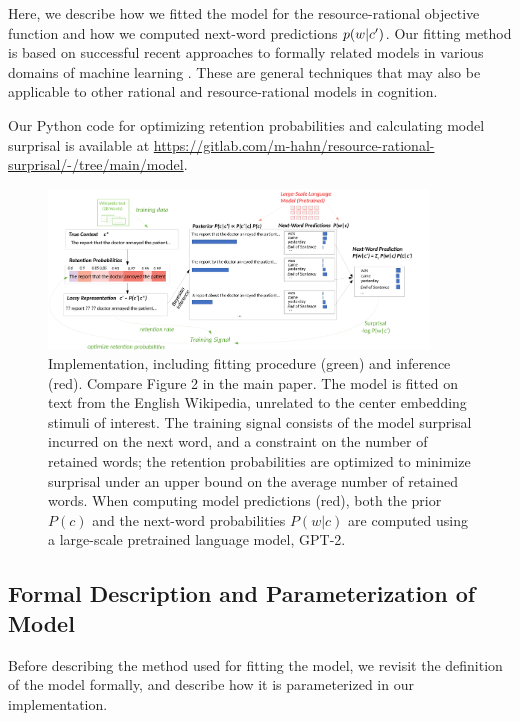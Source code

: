 Here, we describe how we fitted the model for the resource-rational objective function  and how we computed next-word predictions $p(w|c')$.
Our fitting method is based on successful recent approaches to formally related models in various domains of machine learning  \citep{lei2016rationalizing,hahn_modeling_2016,miao2016language, seo2017neural, yu2017learning, hansen2019neural, lee2019learning}.
These are general techniques that may also be applicable to other rational and resource-rational models in cognition.

Our Python code for optimizing retention probabilities and calculating model surprisal is available at \url{https://gitlab.com/m-hahn/resource-rational-surprisal/-/tree/main/model}.






\begin{figure}
    \centering
        \includegraphics[width=0.9\textwidth]{figures/architecture-joint-new-si.pdf}

    
	\caption{Implementation, including fitting procedure (green) and inference (red). Compare Figure 2 in the main paper. The model is fitted on text from the English Wikipedia, unrelated to the center embedding stimuli of interest. The training signal consists of the model surprisal incurred on the next word, and a constraint on the number of retained words; the retention probabilities are optimized to minimize surprisal under an upper bound on the average number of retained words. When computing model predictions (red), both the prior $P(c)$ and the next-word probabilities $P(w|c)$ are computed using a large-scale pretrained language model, GPT-2.}
    \label{fig:model-training-viz}
\end{figure}



\subsection{Formal Description and Parameterization of Model}
Before describing the method used for fitting the model, we revisit the definition of the model formally, and describe how it is parameterized in our implementation.

